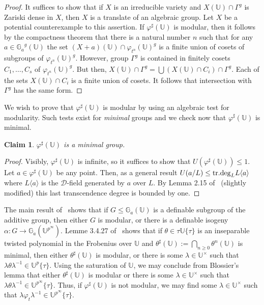 \documentclass{amsart}
\newcommand{\Ga}{{{\mathbb G}_a}}
\newcommand{\UU}{{\mathbb U}}
\newcommand{\cD}{{\mathcal D}}
\newtheorem{claim}[thm]{Claim}
\theoremstyle{definition}
\theoremstyle{remark}
\begin{document}
\begin{proof}
It suffices to show that if $X$ is an irreducible
variety and $X(\UU) \cap \Gamma^g$ is Zariski dense in $X$, then 
$X$ is a translate of an algebraic group.  Let $X$ be a potential
counterexample to this assertion.  If $\varphi^\sharp(\UU)$ is 
modular, then it follows by the compactness theorem that there is 
a natural number $n$ such that for any $a \in \Ga^g(\UU)$ the set
$(X + a) (\UU) \cap \varphi_{t^n}(\UU)^g$ is a finite union of 
cosets of subgroups of $\varphi_{t^n}(\UU)^g$.  However,
group $\Gamma^g$ is contained in finitely cosets $C_1, \ldots, C_s$ 
of $\varphi_{t^n}(\UU)^g$.  But then, $X(\UU) \cap \Gamma^g = 
\bigcup (X(\UU) \cap C_i) \cap \Gamma^g$.  Each of the sets $X(\UU) \cap C_i$ 
is a finite union of cosets.  It follows that intersection with 
$\Gamma^g$ has the same form.
\end{proof}


We wish to prove that $\varphi^\sharp(\UU)$ is modular by using 
an algebraic test for modularity.  Such tests exist for \emph{minimal} groups and we check
now that $\varphi^\sharp(\UU)$ is minimal.

\begin{claim}
$\varphi^\sharp(\UU)$ is a minimal group.
\end{claim}

\begin{proof}
Visibly, $\varphi^\sharp(\UU)$ is infinite, so it suffices to show that $U(\varphi^\sharp(\UU)) \leq 1$.
Let $a \in \varphi^\sharp(\UU)$ be any point.  Then, as a general result 
$U(a/L) \leq {\rm tr.deg}_L L \langle a \rangle$ where $L \langle a \rangle$ is the $\cD$-field generated by
$a$ over $L$. By Lemma 2.15 of~\cite{HrML} (slightly modified) this last transcendence degree is bounded by one.
\end{proof}


The main result of~\cite{BD} shows that if $G \leq \Ga(\UU)$ is a 
definable subgroup of the additive group, then either $G$ is modular, or
there is a definable isogeny $\alpha:G \to \Ga(\UU^{p^\infty})$.  
Lemme 3.4.27 of~\cite{Blossier} shows that if $\theta \in \tau \UU \{ \tau \}$ is
an inseparable twisted polynomial in the Frobenius over $\UU$ and 
$\theta^\sharp(\UU) := \bigcap_{n \geq 0} \theta^n (\UU)$ is minimal, then 
either $\theta^\sharp(\UU)$ is modular, or there is some $\lambda \in \UU^\times$ such 
that $\lambda \theta \lambda^{-1} \in \UU^p \{ \tau \}$.  Using the saturation 
of $\UU$, we may conclude from Blossier's lemma that either $\theta^\sharp(\UU)$ is 
modular or there is some $\lambda \in \UU^\times$ such that 
$\lambda \theta \lambda^{-1} \in \UU^{p^\infty} \{ \tau \}$.    
Thus, if $\varphi^\sharp(\UU)$ is not modular, we may find some $\lambda \in \UU^\times$
such that $\lambda \varphi_t \lambda^{-1} \in \UU^{p^\infty} \{ \tau \}$. 
\end{document}

